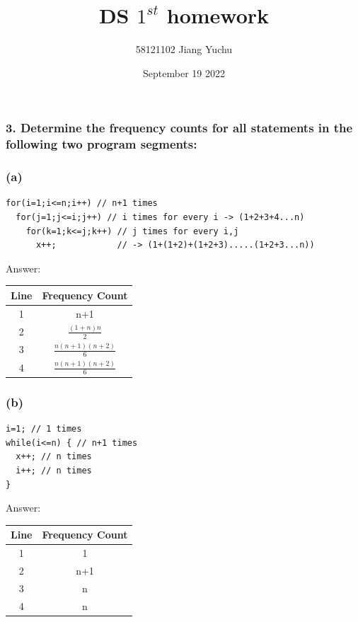\documentclass[a4paper]{article}
\title{DS $1^{st}$  homework}
\author{58121102 Jiang Yuchu}
\date{September 19 2022}
\begin{document}
\maketitle
\subsubsection*{3. Determine the frequency counts for all statements in the following two program segments:}
\subsubsection*{(a)}
\begin{lstlisting}
for(i=1;i<=n;i++) // n+1 times
  for(j=1;j<=i;j++) // i times for every i -> (1+2+3+4...n)
    for(k=1;k<=j;k++) // j times for every i,j 
      x++;            // -> (1+(1+2)+(1+2+3).....(1+2+3...n))
\end{lstlisting}
Answer:
\begin{table}[htbp]
\centering
\begin{tabular}{cc}
    \toprule
    Line & Frequency Count \\
    \midrule
    1 & n+1 \\
    2 & $\frac{(1+n)n}{2}$ \\
    3 & $\frac{ n(n+1)(n+2)}{6}$ \\
    4 & $\frac{ n(n+1)(n+2)}{6}$ \\
    \bottomrule
    \end{tabular}
\end{table}
\par
\subsubsection*{(b)}
\begin{lstlisting}
i=1; // 1 times
while(i<=n) { // n+1 times
  x++; // n times
  i++; // n times
}
\end{lstlisting}
Answer:
\begin{table}[htbp]
\centering
\begin{tabular}{cc}
    \toprule
    Line & Frequency Count \\
    \midrule
    1 & 1 \\
    2 & n+1 \\
    3 & n \\
    4 & n \\
    \bottomrule
    \end{tabular}
\end{table}
\newpage
\end{document}
